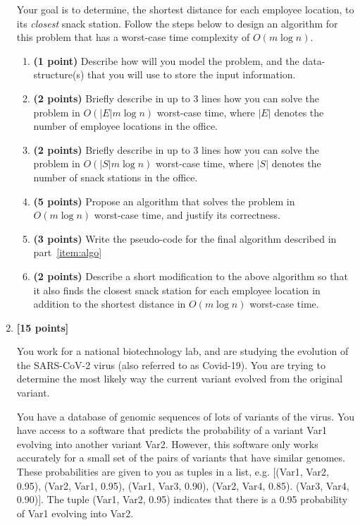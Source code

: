 \documentclass{assignment-373}
\begin{document}
\begin{enumerate}
  Your goal is to determine, the shortest distance for each employee
  location, to its \emph{closest} snack station.
%
  Follow the steps below to design an algorithm for this problem that
  has a worst-case time complexity of $O(m \log n).$
%
\begin{enumerate}
\item \textbf{(1 point)} Describe how will you model the problem, and
  the data-structure(s) that you will use to store the input
  information.
\item \textbf{(2 points)} Briefly describe in up to 3 lines how you
  can solve the problem in $O\left(|E|m \log n\right)$ worst-case
  time, where $|E|$ denotes the number of employee locations in the
  office.
\item \textbf{(2 points)} Briefly describe in up to 3 lines how you
  can solve the problem in $O\left(|S|m \log n\right)$ worst-case
  time, where $|S|$ denotes the number of snack stations in the
  office.
\item \label{item:algo} \textbf{(5 points)} Propose an algorithm that
  solves the problem in $O(m \log n)$ worst-case time, and justify its
  correctness.
\item \textbf{(3 points)} Write the pseudo-code for the final
  algorithm described in part~\ref{item:algo}
\item \textbf{(2 points)} Describe a short modification to the above
  algorithm so that it also finds the closest snack station for each
  employee location in addition to the shortest distance in
  $O(m \log n)$ worst-case time.
\end{enumerate}


\item \textbf{[15 points]}

You work for a national biotechnology lab, and are studying the
evolution of the SARS-CoV-2 virus (also referred to as Covid-19).
You are trying to determine the most likely way the current variant
evolved from the original variant.

You have a database of genomic sequences of lots of variants of the
virus. You have access to a software that predicts the probability of
a variant \textsf{Var1} evolving into another variant
\textsf{Var2}. However, this software only works accurately for a
small set of the pairs of variants that have similar genomes. These
probabilities are given to you as tuples in a list,
e.g. \textsf{[(Var1, Var2, 0.95), (Var2, Var1, 0.95), (Var1, Var3,
  0.90), (Var2, Var4, 0.85). (Var3, Var4, 0.90)]}. The tuple
\textsf{(Var1, Var2, 0.95)} indicates that there is a 0.95 probability
of \textsf{Var1} evolving into \textsf{Var2}.


\end{enumerate}
\end{document}
